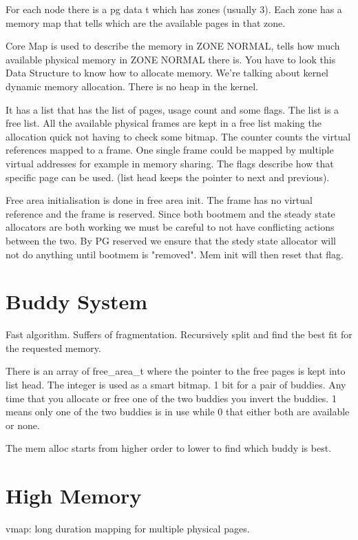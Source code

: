 \documentclass[twoside]{article}
\begin{document}
For each node there is a pg data t which has zones (usually 3). Each zone has a memory map that tells which are the available pages in that zone. 

Core Map is used to describe the memory in ZONE NORMAL, tells how much available physical memory in ZONE NORMAL there is. You have to look this Data Structure to know how to allocate memory. We're talking about kernel dynamic memory allocation. There is no heap in the kernel.

It has a list that has the list of pages, usage count and some flags. The list is a free list. All the available physical frames are kept in a free list making the allocation quick not having to check some bitmap. The counter counts the virtual references mapped to a frame. One single frame could be mapped by multiple virtual addresses for example in memory sharing. The flags describe how that specific page can be used.  (list head keeps the pointer to next and previous).

Free area initialisation is done in free area init. The frame has no virtual reference and the frame is reserved. Since both bootmem and the steady state allocators are both working we must be careful to not have conflicting actions between the two. By PG reserved we ensure that the stedy state allocator will not do anything until bootmem is "removed". Mem init will then reset that flag.

\section{Buddy System}

Fast algorithm. Suffers of fragmentation. Recursively split and find the best fit for the requested memory. 

There is an array of free\_area\_t where the pointer to the free pages is kept into list head. The integer is used as a smart bitmap. 1 bit for a pair of buddies. Any time that you allocate or free one of the two buddies you invert the buddies. 1 means only one of the two buddies is in use while 0 that either both are available or none. 

The mem alloc starts from higher order to lower to find which buddy is best. 


\section{High Memory}

vmap: long duration mapping for multiple physical pages.
\end{document}
